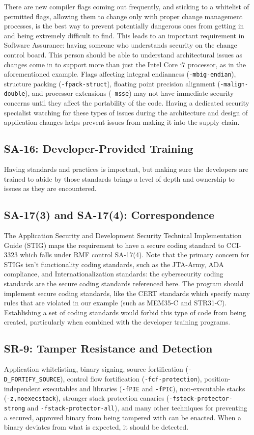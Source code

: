 There are new compiler flags coming out frequently, and sticking to a whitelist of permitted flags, allowing them to change only with proper change management processes, is the best way to prevent potentially dangerous ones from getting in and being extremely difficult to find. This leads to an important requirement in Software Assurance: having someone who understands security on the change control board. This person should be able to understand architectural issues as changes come in to support more than just the Intel Core i7 processor, as in the aforementioned example. Flags affecting integral endianness (\texttt{-mbig-endian}), structure packing (\texttt{-fpack-struct}), floating point precision alignment (\texttt{-malign-double}), and processor extensions (\texttt{-msse}) may not have immediate security concerns until they affect the portability of the code. Having a dedicated security specialist watching for these types of issues during the architecture and design of application changes helps prevent issues from making it into the supply chain.

\subsection*{SA-16: Developer-Provided Training}
Having standards and practices is important, but making sure the developers are trained to abide by those standards brings a level of depth and ownership to issues as they are encountered. 

\subsection*{SA-17(3) and SA-17(4): Correspondence}
The Application Security and Development Security Technical Implementation Guide (STIG) maps the requirement to have a secure coding standard to CCI-3323 which falls under RMF control SA-17(4). Note that the primary concern for STIGs isn't functionality coding standards, such as the JTA-Army, ADA compliance, and Internationalization standards: the cybersecurity coding standards are the secure coding standards referenced here. The program should implement secure coding standards, like the CERT standards which specify many rules that are violated in our example (such as MEM35-C and STR31-C). Establishing a set of coding standards would forbid this type of code from being created, particularly when combined with the developer training programs.

\subsection*{SR-9: Tamper Resistance and Detection}
Application whitelisting, binary signing, source fortification (\texttt{-D\_FORTIFY\_SOURCE}), control flow fortification (\texttt{-fcf-protection}), position-independent executables and libraries (\texttt{-fPIE} and \texttt{-fPIC}), non-executable stacks (\texttt{-z,noexecstack}), stronger stack protection canaries (\texttt{-fstack-protector-strong} and \texttt{-fstack-protector-all}), and many other techniques for preventing a secured, approved binary from being tampered with can be enacted. When a binary deviates from what is expected, it should be detected.


